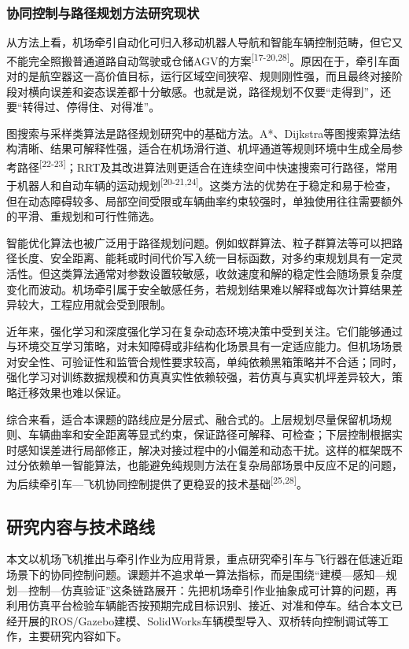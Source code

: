 \subsubsection{协同控制与路径规划方法研究现状}

从方法上看，机场牵引自动化可归入移动机器人导航和智能车辆控制范畴，但它又不能完全照搬普通道路自动驾驶或仓储AGV的方案\textsuperscript{[17-20,28]}。原因在于，牵引车面对的是航空器这一高价值目标，运行区域空间狭窄、规则刚性强，而且最终对接阶段对横向误差和姿态误差都十分敏感。也就是说，路径规划不仅要``走得到''，还要``转得过、停得住、对得准''。

图搜索与采样类算法是路径规划研究中的基础方法。A*、Dijkstra等图搜索算法结构清晰、结果可解释性强，适合在机场滑行道、机坪通道等规则环境中生成全局参考路径\textsuperscript{[22-23]}；RRT及其改进算法则更适合在连续空间中快速搜索可行路径，常用于机器人和自动车辆的运动规划\textsuperscript{[20-21,24]}。这类方法的优势在于稳定和易于检查，但在动态障碍较多、局部空间受限或车辆曲率约束较强时，单独使用往往需要额外的平滑、重规划和可行性筛选。

智能优化算法也被广泛用于路径规划问题。例如蚁群算法、粒子群算法等可以把路径长度、安全距离、能耗或时间代价写入统一目标函数，对多约束规划具有一定灵活性。但这类算法通常对参数设置较敏感，收敛速度和解的稳定性会随场景复杂度变化而波动。机场牵引属于安全敏感任务，若规划结果难以解释或每次计算结果差异较大，工程应用就会受到限制。

近年来，强化学习和深度强化学习在复杂动态环境决策中受到关注。它们能够通过与环境交互学习策略，对未知障碍或非结构化场景具有一定适应能力。但机场场景对安全性、可验证性和监管合规性要求较高，单纯依赖黑箱策略并不合适；同时，强化学习对训练数据规模和仿真真实性依赖较强，若仿真与真实机坪差异较大，策略迁移效果也难以保证。

综合来看，适合本课题的路线应是分层式、融合式的。上层规划尽量保留机场规则、车辆曲率和安全距离等显式约束，保证路径可解释、可检查；下层控制根据实时感知误差进行局部修正，解决对接过程中的小偏差和动态干扰。这样的框架既不过分依赖单一智能算法，也能避免纯规则方法在复杂局部场景中反应不足的问题，为后续牵引车---飞机协同控制提供了更稳妥的技术基础\textsuperscript{[25,28]}。

\subsection{研究内容与技术路线}

本文以机场飞机推出与牵引作业为应用背景，重点研究牵引车与飞行器在低速近距场景下的协同控制问题。课题并不追求单一算法指标，而是围绕``建模---感知---规划---控制---仿真验证''这条链路展开：先把机场牵引作业抽象成可计算的问题，再利用仿真平台检验车辆能否按预期完成目标识别、接近、对准和停车。结合本文已经开展的ROS/Gazebo建模、SolidWorks车辆模型导入、双桥转向控制调试等工作，主要研究内容如下。

